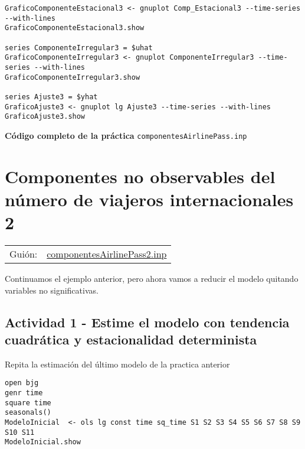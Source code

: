 \documentclass[11pt]{article}
\begin{document}
\begin{enumerate}
\begin{itemize}
{\begin{verbatim}
GraficoComponenteEstacional3 <- gnuplot Comp_Estacional3 --time-series --with-lines
GraficoComponenteEstacional3.show

series ComponenteIrregular3 = $uhat
GraficoComponenteIrregular3 <- gnuplot ComponenteIrregular3 --time-series --with-lines
GraficoComponenteIrregular3.show

series Ajuste3 = $yhat
GraficoAjuste3 <- gnuplot lg Ajuste3 --time-series --with-lines
GraficoAjuste3.show
\end{verbatim}
}
\end{itemize}


\vspace{10pt}
\noindent
\textbf{Código completo de la práctica} \texttt{componentesAirlinePass.inp}
\vspace{10pt}

\clearpage
\end{enumerate}


\section{Componentes no observables del número de viajeros internacionales 2}
\label{sec:org67d71e0}
\begin{center}
\begin{tabular}{ll}
Guión: & \href{https://github.com/mbujosab/EconometriaAplicada-SRC/blob/main/Practicas/PracticasGretl/pub/scripts/componentesAirlinePass2.inp}{componentesAirlinePass2.inp}\\[0pt]
\end{tabular}
\end{center}

Continuamos el ejemplo anterior, pero ahora vamos a reducir el modelo
quitando variables no significativas.

\subsection{Actividad 1 - Estime el modelo con tendencia cuadrática y estacionalidad determinista}
\label{sec:org530e692}

Repita la estimación del último modelo de la practica anterior

{\vspace{0pt} \footnotesize \color{gray!70!black}
\begin{verbatim}
open bjg
genr time
square time
seasonals()
ModeloInicial  <- ols lg const time sq_time S1 S2 S3 S4 S5 S6 S7 S8 S9 S10 S11
ModeloInicial.show
\end{verbatim}
}
\end{document}
